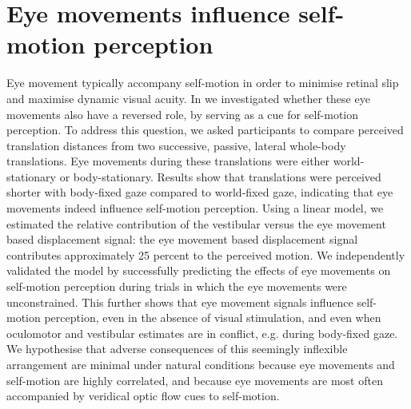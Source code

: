 \section{Eye movements influence self-motion perception}
Eye movement typically accompany self-motion in order to minimise retinal slip and maximise dynamic visual acuity. In  we investigated whether these eye movements also have a reversed role, by serving as a cue for self-motion perception. To address this question, we asked participants to compare perceived translation distances from two successive, passive, lateral whole-body translations. Eye movements during these translations were either world-stationary or body-stationary. Results show that translations were perceived shorter with body-fixed gaze compared to world-fixed gaze, indicating that eye movements indeed influence self-motion perception. Using a linear model, we estimated the relative contribution of the vestibular versus the eye movement based displacement signal: the eye movement based displacement signal  contributes approximately 25 percent to the perceived motion. We independently validated the model by successfully predicting the effects of eye movements on self-motion perception during trials in which the eye movements were unconstrained. This further shows that eye movement signals influence self-motion perception, even in the absence of visual stimulation, and even when oculomotor and vestibular estimates are in conflict, e.g. during body-fixed gaze. We hypothesise that adverse consequences of this seemingly inflexible arrangement are minimal under natural conditions because eye movements and self-motion are highly correlated, and because eye movements are most often accompanied by veridical optic flow cues to self-motion.

